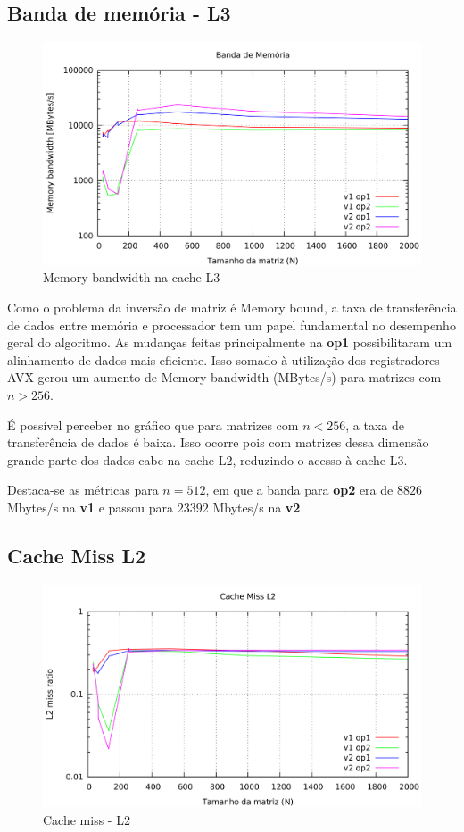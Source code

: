 \documentclass[12pt]{article}
\begin{document}
\subsection{Banda de memória - L3}

\begin{figure}[H]
\centering
    \includegraphics[width=1\textwidth]{img/banda.png}
    \caption{Memory bandwidth na cache L3}
\end{figure}

Como o problema da inversão de matriz é Memory bound, a taxa de transferência de dados entre memória e processador tem um papel fundamental no desempenho geral do algoritmo. As mudanças feitas principalmente na \textbf{op1} possibilitaram um alinhamento de dados mais eficiente. Isso somado à utilização dos registradores AVX gerou um aumento de Memory bandwidth (MBytes/s) para matrizes com $n > 256$.

É possível perceber no gráfico que para matrizes com $n < 256$, a taxa de transferência de dados é baixa. Isso ocorre pois com matrizes dessa dimensão grande parte dos dados cabe na cache L2, reduzindo o acesso à cache L3.

Destaca-se as métricas para $n = 512$, em que a banda para \textbf{op2} era de $8826$ Mbytes/s na \textbf{v1} e passou para $23392$ Mbytes/s na \textbf{v2}.


\subsection{Cache Miss L2}

\begin{figure}[H]
\centering
    \includegraphics[width=1\textwidth]{img/cachemiss.png}
    \caption{Cache miss - L2}
\end{figure}
\end{document}
